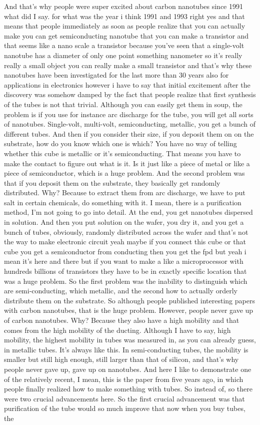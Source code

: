 And that's why people were super excited about carbon nanotubes since 1991 what did I say. for what was the year i think 1991 and 1993 right yes and that means that people immediately as soon as people realize that you can actually make you can get semiconducting nanotube that you can make a transistor and that seems like a nano scale a transistor because you've seen that a single-volt nanotube has a diameter of only one point something nanometer so it's really really a small object you can really make a small transistor and that's why these nanotubes have been investigated for the last more than 30 years also for applications in electronics however i have to say that initial excitement after the discovery was somehow damped by the fact that people realize that first synthesis of the tubes is not that trivial. Although you can easily get them in soup, the problem is if you use for instance arc discharge for the tube, you will get all sorts of nanotubes. Single-volt, multi-volt, semiconducting, metallic, you get a bunch of different tubes. And then if you consider their size, if you deposit them on on the substrate, how do you know which one is which? You have no way of telling whether this cube is metallic or it's semiconducting. That means you have to make the contact to figure out what is it. Is it just like a piece of metal or like a piece of semiconductor, which is a huge problem. And the second problem was that if you deposit them on the substrate, they basically get randomly distributed. Why? Because to extract them from arc discharge, we have to put salt in certain chemicals, do something with it. I mean, there is a purification method, I'm not going to go into detail. At the end, you get nanotubes dispersed in solution. And then you put solution on the wafer, you dry it, and you get a bunch of tubes, obviously, randomly distributed across the wafer and that's not the way to make electronic circuit yeah maybe if you connect this cube or that cube you get a semiconductor from conducting then you get the fpd but yeah i mean it's here and there but if you want to make a like a microprocessor with hundreds billions of transistors they have to be in exactly specific location that was a huge problem. So the first problem was the inability to distinguish which are semi-conducting, which metallic, and the second how to actually orderly distribute them on the substrate. So although people published interesting papers with carbon nanotubes, that is the huge problem. However, people never gave up of carbon nanotubes. Why? Because they also have a high mobility and that comes from the high mobility of the ducting. Although I have to say, high mobility, the highest mobility in tubes was measured in, as you can already guess, in metallic tubes. It's always like this. In semi-conducting tubes, the mobility is smaller but still high enough, still larger than that of silicon, and that's why people never gave up, gave up on nanotubes. And here I like to demonstrate one of the relatively recent, I mean, this is the paper from five years ago, in which people finally realized how to make something with tubes. So instead of, so there were two crucial advancements here. So the first crucial advancement was that purification of the tube would so much improve that now when you buy tubes, the 